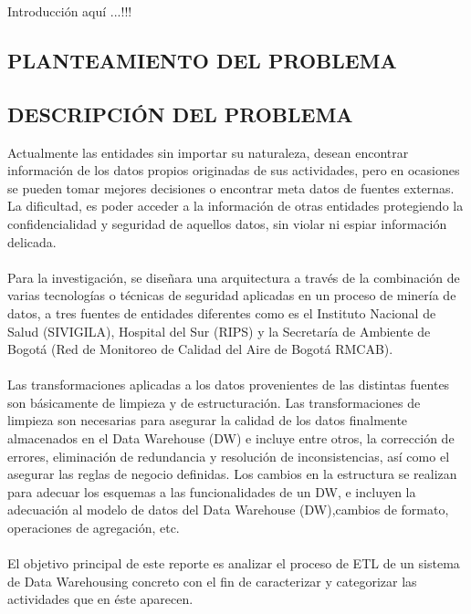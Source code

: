 \documentclass[a4paper,openright,12pt]{book}
\theoremstyle{definition}
\theoremstyle{remark}
\begin{document}
Introducción aquí ...!!!

\clearpage

\begin{center}
 \chapter{PLANTEAMIENTO DEL PROBLEMA}\label{cap.planteamiento}
 \end{center}

\section{DESCRIPCIÓN DEL PROBLEMA}

Actualmente las entidades sin importar su naturaleza, desean encontrar información de los datos propios originadas de sus actividades, pero en ocasiones se pueden tomar mejores decisiones o encontrar meta datos de fuentes externas. La dificultad, es poder acceder a la información de otras entidades protegiendo la confidencialidad y seguridad de aquellos datos, sin violar ni espiar información delicada.\\\\
Para la investigación, se diseñara una arquitectura a través de la combinación de varias tecnologías o técnicas de seguridad aplicadas en un proceso de minería de datos, a tres fuentes de entidades diferentes como es el Instituto Nacional de Salud (SIVIGILA), Hospital del Sur (RIPS) y la Secretaría de Ambiente de Bogotá (Red de Monitoreo de Calidad del Aire de Bogotá RMCAB).\\\\
Las transformaciones aplicadas a los datos provenientes de las distintas fuentes son básicamente de limpieza y de estructuración. Las transformaciones de limpieza son
necesarias para asegurar la calidad de los datos finalmente almacenados en el  Data Warehouse (DW) e incluye entre otros, la corrección de errores, eliminación de redundancia y resolución de inconsistencias, así como el asegurar las reglas de negocio definidas. Los cambios en la estructura se realizan para adecuar los esquemas a las funcionalidades de un DW, e incluyen la adecuación al modelo de datos del  Data Warehouse (DW),cambios de formato, operaciones de agregación, etc.\\\\
El objetivo principal de este reporte es analizar el proceso de ETL de un sistema de Data Warehousing concreto con el fin de caracterizar y categorizar las actividades que en éste aparecen. \\\\
\end{document}
